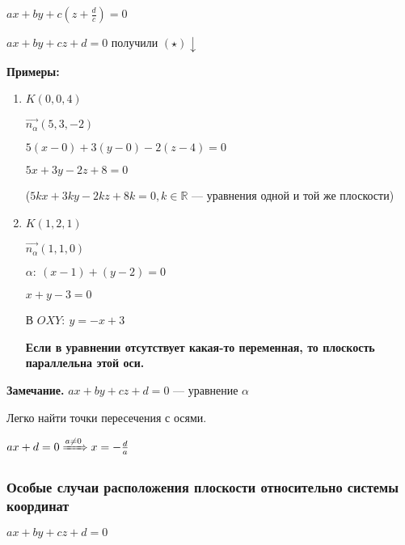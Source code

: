 \documentclass{article}
\begin{document}
    \( ax + by + c(z + \frac{d}{c}) = 0 \)

    \( ax + by + cz + d = 0 \) получили \((\star) \downarrow \)

    \textbf{Примеры:} 
    
    \begin{enumerate}
        
    \item 
    
        \( K(0, 0, 4) \)

        \( \vec{n_\alpha}(5, 3, -2) \)
        
        \( 5(x - 0) + 3(y - 0) - 2(z - 4) = 0 \)
        
        \( 5x + 3y - 2z + 8 = 0 \)
 
        (\( 5kx + 3ky - 2kz + 8k = 0, k \in \mathbb{R} \) --- уравнения одной и той же плоскости)

    \item 
    
        \( K(1, 2, 1) \)

        \( \vec{n_\alpha}(1, 1, 0) \)

        \( \alpha:\ (x - 1) + (y - 2) = 0 \)

        \( x + y - 3 = 0 \)

        В \(OXY:\ y = -x + 3\) 

        \textbf{Если в уравнении отсутствует какая-то переменная, то плоскость параллельна этой оси.}
    \end{enumerate}

    \textbf{Замечание.} \( ax + by + cz + d = 0 \) --- уравнение \( \alpha \) 

    Легко найти точки пересечения с осями. 

    \( ax + d = 0 \xRightarrow[]{a \neq 0} x = -\frac{d}{a} \)

    \subsubsection{Особые случаи расположения плоскости относительно системы координат}

    \( ax + by + cz + d = 0 \)
\end{document}
